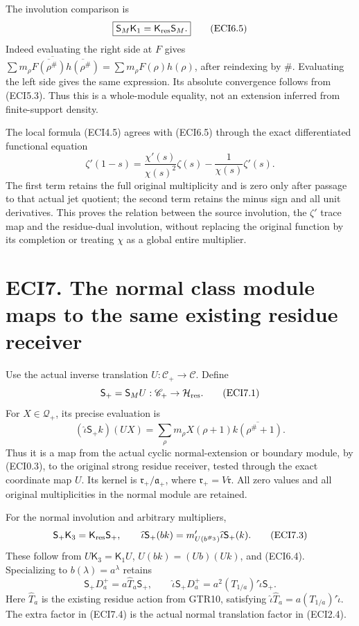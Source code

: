 The involution comparison is \[
\boxed{\mathsf S_M\mathsf K_1=\mathsf K_{\rm res}\mathsf S_M.}
\tag{ECI6.5}
\] Indeed evaluating the right side at \(F\) gives
\(\overline{\sum m_\rho\overline{F(\rho^\#)}\overline{h(\rho^\#)}}
=\sum m_\rho F(\rho)h(\rho)\), after reindexing by \(\#\). Evaluating
the left side gives the same expression. Its absolute convergence
follows from (ECI5.3). Thus this is a whole-module equality, not an
extension inferred from finite-support density.

The local formula (ECI4.5) agrees with (ECI6.5) through the exact
differentiated functional equation \[
\zeta'(1-s)=\frac{\chi'(s)}{\chi(s)^2}\zeta(s)
-\frac{1}{\chi(s)}\zeta'(s).
\tag{ECI6.6}
\] The first term retains the full original multiplicity and is zero
only after passage to that actual jet quotient; the second term retains
the minus sign and all unit derivatives. This proves the relation
between the source involution, the \(\zeta'\) trace map and the
residue-dual involution, without replacing the original function by its
completion or treating \(\chi\) as a global entire multiplier.

\section{ECI7. The normal class module maps to the same existing residue
receiver}\label{eci7.-the-normal-class-module-maps-to-the-same-existing-residue-receiver}

Use the actual inverse translation \(U:\mathscr C_+\to\mathscr C\).
Define \[
\mathsf S_+=\mathsf S_MU:\mathscr C_+\to\mathcal H_{\rm res}.
\tag{ECI7.1}
\] For \(X\in\mathcal Q_+\), its precise evaluation is \[
(\widehat\iota\mathsf S_+k)(UX)
=\sum_\rho m_\rho X(\rho+1)\overline{k(\rho^\#+1)}.
\tag{ECI7.2}
\] Thus it is a map from the actual cyclic normal-extension or boundary
module, by (ECI0.3), to the original strong residue receiver, tested
through the exact coordinate map \(U\). Its kernel is
\(\mathfrak r_+/\mathfrak a_+\), where \(\mathfrak r_+=V\mathfrak r\).
All zero values and all original multiplicities in the normal module are
retained.

For the normal involution and arbitrary multipliers, \[
\mathsf S_+\mathsf K_3=\mathsf K_{\rm res}\mathsf S_+,
\qquad
\widehat\iota\mathsf S_+(bk)
=m_{U(b^{\#_3})}'\widehat\iota\mathsf S_+(k).
\tag{ECI7.3}
\] These follow from \(U\mathsf K_3=\mathsf K_1U\), \(U(bk)=(Ub)(Uk)\),
and (ECI6.4). Specializing to \(b(\lambda)=a^\lambda\) retains \[
\boxed{\mathsf S_+D_a^+=a\widehat T_a\mathsf S_+,
\qquad
\widehat\iota\mathsf S_+D_a^+
=a^2(T_{1/a})'\widehat\iota\mathsf S_+.}
\tag{ECI7.4}
\] Here \(\widehat T_a\) is the existing residue action from GTR10,
satisfying \(\widehat\iota\widehat T_a=a(T_{1/a})'\widehat\iota\). The
extra factor in (ECI7.4) is the actual normal translation factor in
(ECI2.4).

